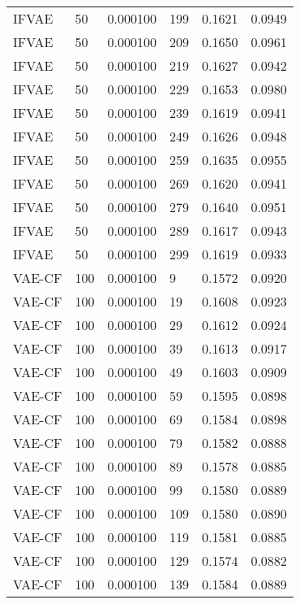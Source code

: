 \begin{tabular}{llrlrr}
   IFVAE &   50 &  0.000100 &   199 &  0.1621 &       0.0949 \\
   IFVAE &   50 &  0.000100 &   209 &  0.1650 &       0.0961 \\
   IFVAE &   50 &  0.000100 &   219 &  0.1627 &       0.0942 \\
   IFVAE &   50 &  0.000100 &   229 &  0.1653 &       0.0980 \\
   IFVAE &   50 &  0.000100 &   239 &  0.1619 &       0.0941 \\
   IFVAE &   50 &  0.000100 &   249 &  0.1626 &       0.0948 \\
   IFVAE &   50 &  0.000100 &   259 &  0.1635 &       0.0955 \\
   IFVAE &   50 &  0.000100 &   269 &  0.1620 &       0.0941 \\
   IFVAE &   50 &  0.000100 &   279 &  0.1640 &       0.0951 \\
   IFVAE &   50 &  0.000100 &   289 &  0.1617 &       0.0943 \\
   IFVAE &   50 &  0.000100 &   299 &  0.1619 &       0.0933 \\
  VAE-CF &  100 &  0.000100 &     9 &  0.1572 &       0.0920 \\
  VAE-CF &  100 &  0.000100 &    19 &  0.1608 &       0.0923 \\
  VAE-CF &  100 &  0.000100 &    29 &  0.1612 &       0.0924 \\
  VAE-CF &  100 &  0.000100 &    39 &  0.1613 &       0.0917 \\
  VAE-CF &  100 &  0.000100 &    49 &  0.1603 &       0.0909 \\
  VAE-CF &  100 &  0.000100 &    59 &  0.1595 &       0.0898 \\
  VAE-CF &  100 &  0.000100 &    69 &  0.1584 &       0.0898 \\
  VAE-CF &  100 &  0.000100 &    79 &  0.1582 &       0.0888 \\
  VAE-CF &  100 &  0.000100 &    89 &  0.1578 &       0.0885 \\
  VAE-CF &  100 &  0.000100 &    99 &  0.1580 &       0.0889 \\
  VAE-CF &  100 &  0.000100 &   109 &  0.1580 &       0.0890 \\
  VAE-CF &  100 &  0.000100 &   119 &  0.1581 &       0.0885 \\
  VAE-CF &  100 &  0.000100 &   129 &  0.1574 &       0.0882 \\
  VAE-CF &  100 &  0.000100 &   139 &  0.1584 &       0.0889 \\

\end{tabular}
